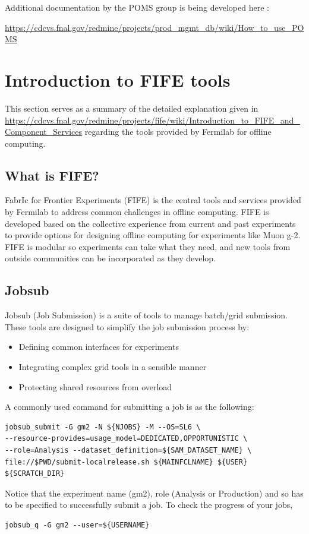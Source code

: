 \noindent Additional documentation by the POMS group is being developed here : 
\begin{center}
{\footnotesize
\url{https://cdcvs.fnal.gov/redmine/projects/prod_mgmt_db/wiki/How_to_use_POMS}}
\end{center}

\appendix

\section{Introduction to FIFE tools}

This section serves as a summary of the detailed explanation given in \url{https://cdcvs.fnal.gov/redmine/projects/fife/wiki/Introduction_to_FIFE_and_Component_Services} regarding the tools provided by Fermilab for offline computing.


\subsection{What is FIFE?}

FabrIc for Frontier Experiments (FIFE) is the central tools and services provided by Fermilab to address common challenges in offline computing. FIFE is developed based on the collective experience from current and past experiments to provide options for designing offline computing for experiments like Muon g-2. FIFE is modular so experiments can take what they need, and new tools from outside communities can be incorporated as they develop.

\subsection{Jobsub}

Jobsub (Job Submission) is a suite of tools to manage batch/grid submission. These tools are designed to simplify the job submission process by:
\begin{itemize}
\item Defining common interfaces for experiments
\item Integrating complex grid tools in a sensible manner
\item Protecting shared resources from overload
\end{itemize}

\noindent
A commonly used command for submitting a job is as the following:
\begin{verbatim}
jobsub_submit -G gm2 -N ${NJOBS} -M --OS=SL6 \
--resource-provides=usage_model=DEDICATED,OPPORTUNISTIC \
--role=Analysis --dataset_definition=${SAM_DATASET_NAME} \
file://$PWD/submit-localrelease.sh ${MAINFCLNAME} ${USER} ${SCRATCH_DIR} 
\end{verbatim}
%
Notice that the experiment name (gm2), role (Analysis or Production) and so has to be specified to successfully submit a job. To check the progress of your jobs,
%
\begin{verbatim}
jobsub_q -G gm2 --user=${USERNAME}
\end{verbatim}



